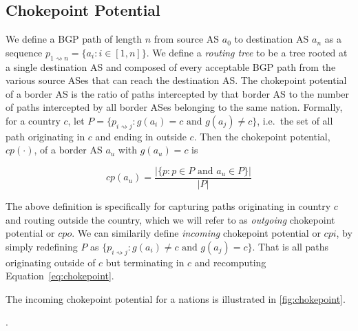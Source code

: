 \subsection{Chokepoint Potential}

We define a BGP path of length $n$ from source AS $a_0$ to destination AS $a_n$
as a sequence $p_{1\rightsquigarrow n} = \{a_i : i \in [1,n]\}$.  We define a
\textit{routing tree} to be a tree rooted at a single destination AS and
composed of every acceptable BGP path from the various source ASes that can
reach the destination AS.  The
chokepoint potential of a border AS is the ratio of paths intercepted by that
border AS to the number of paths intercepted by all border ASes belonging to
the same nation. Formally, for a country $c$, let $P = \{p_{i \rightsquigarrow
j} : g(a_i)=c \text{ and } g(a_j)\neq c\} $, i.e.\ the set of all path
originating in $c$ and ending in outside $c$. Then the chokepoint potential,
$cp(\cdot)$, of a border AS $a_u$ with $g(a_u) = c$ is

\begin{equation}
  \label{eq:chokepoint}
  cp(a_u) = \frac{|\{p: p \in P \text{ and } a_u \in P\}|}{|P|}
\end{equation}

The above definition is specifically for capturing paths originating in country
$c$ and routing outside the country, which we will refer to as
\textit{outgoing} chokepoint potential or $cpo$. We can similarily define
\textit{incoming} chokepoint potential or $cpi$, by simply redefining $P$ as $\{p_{i
\rightsquigarrow j}: g(a_i) \neq c \text{ and } g(a_j) = c\}$. That is all
paths originating outside of $c$ but terminating in $c$ and recomputing
Equation~\ref{eq:chokepoint}. 

The incoming chokepoint
potential for a nations is illustrated in \figurename
\ref{fig:chokepoint}.

.

